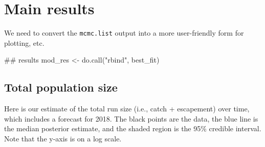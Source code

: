 \documentclass[11pt,]{article}
\newenvironment{Shaded}{}{}
\newcommand{\CommentTok}[1]{\textcolor[rgb]{0.00,0.50,0.00}{#1}}
\newcommand{\KeywordTok}[1]{\textcolor[rgb]{0.00,0.00,1.00}{#1}}
\newcommand{\NormalTok}[1]{#1}
\newcommand{\StringTok}[1]{\textcolor[rgb]{0.00,0.50,0.50}{#1}}
\begin{document}
\hypertarget{main-results}{%
\section{Main results}\label{main-results}}

We need to convert the \texttt{mcmc.list} output into a more
user-friendly form for plotting, etc.

\begin{Shaded}
\begin{Highlighting}[]
\CommentTok{## results}
\NormalTok{mod_res <-}\StringTok{ }\KeywordTok{do.call}\NormalTok{(}\StringTok{"rbind"}\NormalTok{, best_fit)}
\end{Highlighting}
\end{Shaded}

\hypertarget{total-population-size}{%
\subsection{Total population size}\label{total-population-size}}

Here is our estimate of the total run size (i.e., catch + escapement)
over time, which includes a forecast for 2018. The black points are the
data, the blue line is the median posterior estimate, and the shaded
region is the 95\% credible interval. Note that the y-axis is on a log
scale.
\end{document}
